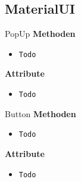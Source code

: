 \subsection{MaterialUI}

    \begin{Class}{PopUp}
        \textbf{Methoden}
        \begin{itemize}
            \item \texttt{Todo}
        \end{itemize}
        
        \textbf{Attribute}
        \begin{itemize}
            \item \texttt{Todo}
        \end{itemize}
    \end{Class}

    \begin{Class}{Button}
        \textbf{Methoden}
        \begin{itemize}
            \item \texttt{Todo}
        \end{itemize}
        
        \textbf{Attribute}
        \begin{itemize}
            \item \texttt{Todo}
        \end{itemize}
    \end{Class}

